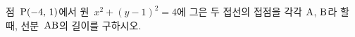 점~$\mathrm{P}(-4,\mkern3mu 1)$에서 원~$x^2+(y-1)^2=4$에 그은 두 접선의 접점을 각각 $\mathrm{A}$, $\mathrm{B}$라 할 때, 선분~$\mathrm{AB}$의 길이를 구하시오.
